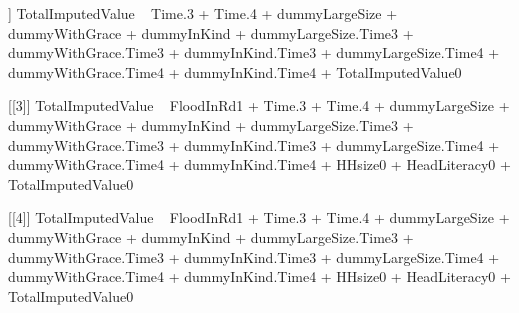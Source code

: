 \begin{Schunk}
\begin{Soutput}
[[2]]
TotalImputedValue ~ Time.3 + Time.4 + dummyLargeSize + dummyWithGrace + 
    dummyInKind + dummyLargeSize.Time3 + dummyWithGrace.Time3 + 
    dummyInKind.Time3 + dummyLargeSize.Time4 + dummyWithGrace.Time4 + 
    dummyInKind.Time4 + TotalImputedValue0

[[3]]
TotalImputedValue ~ FloodInRd1 + Time.3 + Time.4 + dummyLargeSize + 
    dummyWithGrace + dummyInKind + dummyLargeSize.Time3 + dummyWithGrace.Time3 + 
    dummyInKind.Time3 + dummyLargeSize.Time4 + dummyWithGrace.Time4 + 
    dummyInKind.Time4 + HHsize0 + HeadLiteracy0 + TotalImputedValue0

[[4]]
TotalImputedValue ~ FloodInRd1 + Time.3 + Time.4 + dummyLargeSize + 
    dummyWithGrace + dummyInKind + dummyLargeSize.Time3 + dummyWithGrace.Time3 + 
    dummyInKind.Time3 + dummyLargeSize.Time4 + dummyWithGrace.Time4 + 
    dummyInKind.Time4 + HHsize0 + HeadLiteracy0 + TotalImputedValue0
\end{Soutput}
\end{Schunk}



